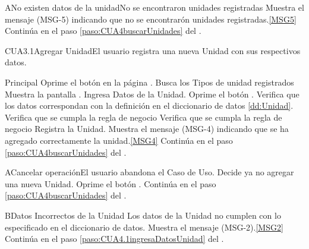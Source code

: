 	\begin{UCtrayectoriaA}{A}{No existen datos de la unidad}{No se encontraron unidades registradas}
			\UCpaso[\UCactor] Muestra el mensaje (MSG-5) indicando que no se encontrarón unidades registradas.\ref{MSG5}
			\UCpaso Continúa en el paso \ref{paso:CUA4buscarUnidades} del .
	\end{UCtrayectoriaA}
	\begin{UseCase}{CUA3.1}{Agregar Unidad}{El usuario registra una nueva Unidad con sus respectivos datos.}
	\end{UseCase}

	\begin{UCtrayectoria}{Principal}
		\UCpaso[\UCactor] Oprime el botón  en la página .
		\UCpaso Busca los Tipos de unidad registrados \label{paso:CUA4.1buscaTiposUnidad}
		\UCpaso Muestra la pantalla .
		\UCpaso Ingresa Datos de la Unidad. \label{paso:CUA4.1ingresaDatosUnidad}
		\UCpaso [\UCactor] Oprime el botón .
		\UCpaso Verifica que los datos correspondan con la definición en el diccionario de datos \ref{dd:Unidad}. 
		\UCpaso Verifica que se cumpla la regla de negocio 
		\UCpaso Verifica que se cumpla la regla de negocio 
 		\UCpaso Registra la Unidad.
		\UCpaso Muestra el mensaje (MSG-4) indicando que se ha agregado correctamente la unidad.\ref{MSG4}
		\UCpaso Continúa en el paso \ref{paso:CUA4buscarUnidades} del .
	\end{UCtrayectoria}
		
	\begin{UCtrayectoriaA}{A}{Cancelar operación}{El usuario abandona el Caso de Uso.}
		\UCpaso[\UCactor] Decide ya no agregar una nueva Unidad.
		\UCpaso[\UCactor] Oprime el botón .
			\UCpaso Continúa en el paso \ref{paso:CUA4buscarUnidades} del .
	\end{UCtrayectoriaA}
	\begin{UCtrayectoriaA}{B}{Datos Incorrectos de la Unidad }{Los datos de la Unidad no cumplen con lo especificado en el diccionario de datos.}
			\UCpaso Muestra el mensaje (MSG-2).\ref{MSG2} 
			\UCpaso Continúa en el paso \ref{paso:CUA4.1ingresaDatosUnidad} del .
	\end{UCtrayectoriaA}


